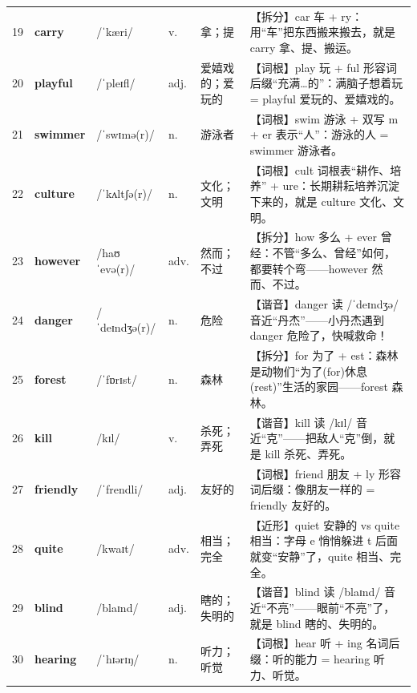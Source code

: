 \documentclass[UTF8,a4paper,11pt,oneside]{ctexbook}
\newcommand{\cellword}[1]{{\bfseries\textcolor{wordcol}{#1}}}
\newcommand{\cellipa}[1]{{\footnotesize\textcolor{ipacol}{#1}}}
\newcommand{\cellpos}[1]{\textcolor{poscol}{#1}}
\newcommand{\cellno}[1]{\textcolor{volcolor!75!black}{#1}}
\begin{document}
{\begin{longtable}{@{}C{0.045\textwidth}L{0.155\textwidth}L{0.175\textwidth}C{0.070\textwidth}L{0.180\textwidth}L{0.282\textwidth}@{}}
 \cellno{19} & \cellword{carry} & \cellipa{/ˈkæri/} & \cellpos{v.} & 拿；提 & \textcolor{tagSplit}{【拆分】}car 车 + ry：用“车”把东西搬来搬去，就是 carry 拿、提、搬运。 \\
\cellno{20} & \cellword{playful} & \cellipa{/ˈpleɪfl/} & \cellpos{adj.} & 爱嬉戏的；爱玩的 & \textcolor{tagRoot}{【词根】}play 玩 + ful 形容词后缀“充满…的”：满脑子想着玩 = playful 爱玩的、爱嬉戏的。 \\
 \cellno{21} & \cellword{swimmer} & \cellipa{/ˈswɪmə(r)/} & \cellpos{n.} & 游泳者 & \textcolor{tagRoot}{【词根】}swim 游泳 + 双写 m + er 表示“人”：游泳的人 = swimmer 游泳者。 \\
\cellno{22} & \cellword{culture} & \cellipa{/ˈkʌltʃə(r)/} & \cellpos{n.} & 文化；文明 & \textcolor{tagRoot}{【词根】}cult 词根表“耕作、培养” + ure：长期耕耘培养沉淀下来的，就是 culture 文化、文明。 \\
 \cellno{23} & \cellword{however} & \cellipa{/haʊˈevə(r)/} & \cellpos{adv.} & 然而；不过 & \textcolor{tagSplit}{【拆分】}how 多么 + ever 曾经：不管“多么、曾经”如何，都要转个弯——however 然而、不过。 \\
\cellno{24} & \cellword{danger} & \cellipa{/ˈdeɪndʒə(r)/} & \cellpos{n.} & 危险 & \textcolor{tagSound}{【谐音】}danger 读 /ˈdeɪndʒə/ 音近“丹杰”——小丹杰遇到 danger 危险了，快喊救命！ \\
 \cellno{25} & \cellword{forest} & \cellipa{/ˈfɒrɪst/} & \cellpos{n.} & 森林 & \textcolor{tagSplit}{【拆分】}for 为了 + est：森林是动物们“为了(for)休息(rest)”生活的家园——forest 森林。 \\
\cellno{26} & \cellword{kill} & \cellipa{/kɪl/} & \cellpos{v.} & 杀死；弄死 & \textcolor{tagSound}{【谐音】}kill 读 /kɪl/ 音近“克”——把敌人“克”倒，就是 kill 杀死、弄死。 \\
 \cellno{27} & \cellword{friendly} & \cellipa{/ˈfrendli/} & \cellpos{adj.} & 友好的 & \textcolor{tagRoot}{【词根】}friend 朋友 + ly 形容词后缀：像朋友一样的 = friendly 友好的。 \\
\cellno{28} & \cellword{quite} & \cellipa{/kwaɪt/} & \cellpos{adv.} & 相当；完全 & \textcolor{tagNear}{【近形】}quiet 安静的 vs quite 相当：字母 e 悄悄躲进 t 后面就变“安静”了，quite 相当、完全。 \\
 \cellno{29} & \cellword{blind} & \cellipa{/blaɪnd/} & \cellpos{adj.} & 瞎的；失明的 & \textcolor{tagSound}{【谐音】}blind 读 /blaɪnd/ 音近“不亮”——眼前“不亮”了，就是 blind 瞎的、失明的。 \\
\cellno{30} & \cellword{hearing} & \cellipa{/ˈhɪərɪŋ/} & \cellpos{n.} & 听力；听觉 & \textcolor{tagRoot}{【词根】}hear 听 + ing 名词后缀：听的能力 = hearing 听力、听觉。 \\
\end{longtable}
}
\end{document}
